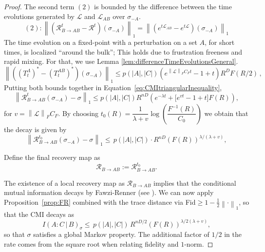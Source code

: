 \documentclass[11pt]{article}
\numberwithin{equation}{section}
\numberwithin{figure}{section}
\numberwithin{table}{section}
\theoremstyle{definition}
\theoremstyle{plain}
\theoremstyle{remark}
\newcommand{\RR}{\mathcal{R}}
\newcommand{\Li}{\mathcal{L}}
\newcommand{\recovery}{\mathcal{R}_{B\to AB}^t}
\newcommand{\normm}[2]{\left\lVert#1\right\rVert_{#2}}
\newcommand{\abs}[1]{\left \vert#1\right\vert}
\begin{document}
\begin{proof}
     The second term $(2)$ is bounded by the difference between the time evolutions generated by $\Li$ and $\Li_{AB}$ over $\sigma_{-A}$.
    \begin{equation}
         (2):\normm{(\recovery-\RR^t)(\sigma_{-A})}{1}=\normm{(e^{t\Li_{AB}}-e^{t\Li})(\sigma_{-A})}{1}
         \label{eq:diferenceRecoveries1}
      \end{equation}
The time evolution on a fixed-point with a perturbation on a set $A$, for short times, is localized ``around the bulk''; This holds due to frustration freeness and rapid mixing. For that, we use Lemma \ref{lem:differenceTimeEvolutionsGeneral}. 
       \begin{equation}
            \normm{\left ((T^\Lambda_t)^*-\left (T^{AB}_t\right )^*\right )(\sigma_{-A})}{1}\leq p(\abs{A},\abs{C}) (e^{\normm{\Li}{F}C_Ft}-1+t)R^{D}F(R/2)  \, ,     
        \end{equation}
Putting both bounds together in Equation~\eqref{eq:CMItriangularInequality},
\begin{equation}
    \normm{\recovery (\sigma_{-A})-\sigma}{1}\leq p(\abs{A},\abs{C})R^{nD}\left (e^{-\lambda t}+\bigl[e^{v t}-1+t\bigr] F(R)\right ),
\end{equation}
for $v=\normm{\Li}{F}C_F$. By choosing $t_0(R)=\dfrac{1}{\lambda +v }\log\left(\dfrac{F^{-1}(R)}{C_0}\right)$
we obtain that the decay is given by
\begin{equation}
    \normm{\mathcal{R}_{B\to AB}^{t_0} (\sigma_{-A})-\sigma}{1}\leq  \,p(\abs{A},\abs{C}) \cdot R^{nD} (F(R))^{\lambda/(\lambda+v)},
\end{equation}

Define the final recovery map as\[\mathcal{R}_{B\to AB}:=\mathcal{R}_{B\to AB}^{t_0}. \]

The existence of a local recovery map as $\RR_{B\to AB}$ implies that the conditional mutual information decays by Fawzi-Renner (see \cite{FawRen15}). We can now apply Proposition~\ref{prop:FR} combined with the trace distance via Fid$ \geq 1- \frac12 \normm{\cdot }{1}$, so that the CMI decays as
\begin{equation}
    I(A : C \,|\, B)_\sigma \le \, p(\abs{A},\abs{C})\, R^{nD/2} (F(R))^{\lambda/2(\lambda+v)} ,
\end{equation}
so that $\sigma$ satisfies a global Markov property. The additional factor of $1/2$ in the rate comes from the square root when relating fidelity and $1$-norm.
\end{proof}
\end{document}
